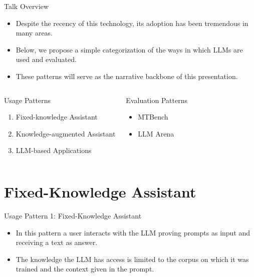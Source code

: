 \documentclass[handout]{beamer}
\begin{document}
\begin{frame}{Talk Overview}
\begin{scriptsize}
\begin{itemize}
 \item Despite the recency of this technology, its adoption has been tremendous in many areas. 
 \item Below, we propose a simple categorization of the ways in which LLMs are used and evaluated.
  \item These patterns will serve as the narrative backbone of this presentation.
\end{itemize}



\begin{columns}[t]
\begin{block}{Usage Patterns}
\begin{enumerate}
\item Fixed-knowledge Assistant
\item Knowledge-augmented Assistant
\item LLM-based Applications 
\end{enumerate}
\end{block}

\begin{block}{Evaluation Patterns}
\begin{itemize}
\item MTBench
\item LLM Arena
\end{itemize}
\end{block}

\end{columns}

\end{scriptsize}
\end{frame}










\section{Fixed-Knowledge Assistant}

\begin{frame}[fragile]{Usage Pattern 1: Fixed-Knowledge Assistant}
\begin{scriptsize}
\begin{itemize}
\item In this pattern a user interacts with the LLM proving prompts as input and receiving a text as answer.
\item The knowledge the LLM has access is limited to the corpus on which it was trained and the context given in the prompt.
\end{itemize}
\end{scriptsize}
\end{frame}
\end{document}
